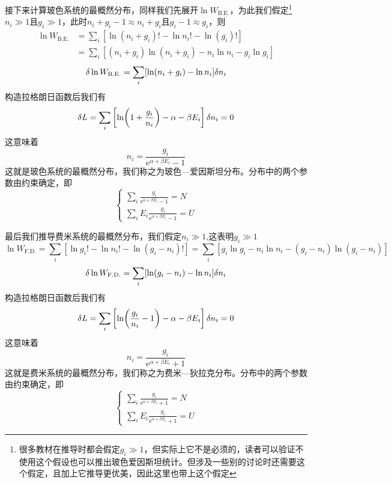 \documentclass[../../main.tex]{subfiles}
\begin{document}
接下来计算玻色系统的最概然分布，同样我们先展开\(\ln W_{\mathrm{B.E.}}\)，为此我们假定\footnote{很多教材在推导时都会假定\(g_i\gg 1\)，但实际上它不是必须的，读者可以验证不使用这个假设也可以推出玻色爱因斯坦统计。但涉及一些别的讨论时还需要这个假定，且加上它推导更优美，因此这里也带上这个假定}\(n_i\gg 1\)且\(g_i\gg 1\)，此时\(n_i+g_i-1\approx n_i+g_i\)且\(g_i-1\approx g_i\)，则
\begin{equation*}
    \begin{split}
        \ln W_{\mathrm{B.E.}}&=\sum_i [\ln(n_i+g_i)!-\ln n_i!-\ln(g_i)!] \\
        &=\sum_i [(n_i+g_i)\ln(n_i+g_i)-n_i\ln n_i-g_i\ln g_i]
    \end{split}
\end{equation*}
\begin{equation*}
    \var\ln W_{\mathrm{B.E.}}=\sum_i [\ln(n_i+g_i)-\ln n_i]\var n_i
\end{equation*}
构造拉格朗日函数后我们有
\begin{equation*}
    \var L=\sum_i \left[\ln(1+\frac{g_i}{n_i})-\alpha-\beta E_i\right]\var n_i=0
\end{equation*}
这意味着
\begin{equation}
    n_i=\frac{g_i}{\mathrm{e}^{\alpha+\beta E_i}-1}
\end{equation}
这就是玻色系统的最概然分布，我们称之为玻色—爱因斯坦分布。分布中的两个参数由约束确定，即
\begin{equation}
    \begin{cases}
        \displaystyle \sum_i \frac{g_i}{\mathrm{e}^{\alpha+\beta E_i}-1}=N \\
        \displaystyle \sum_i E_i\frac{g_i}{\mathrm{e}^{\alpha+\beta E_i}-1}=U
    \end{cases}
\end{equation}

最后我们推导费米系统的最概然分布，我们假定\(n_i\gg 1\),这表明\(g_i\gg 1\)
\begin{equation*}
    \ln W_{\mathrm{F.D.}}=\sum_i [\ln g_i!-\ln n_i!-\ln(g_i-n_i)!]=\sum_i[g_i\ln g_i-n_i\ln n_i-(g_i-n_i)\ln(g_i-n_i)]
\end{equation*}
\begin{equation*}
    \var\ln W_{\mathrm{F.D.}}=\sum_i [\ln(g_i-n_i)-\ln n_i]\var n_i
\end{equation*}
构造拉格朗日函数后我们有
\begin{equation*}
    \var L=\sum_i \left[\ln(\frac{g_i}{n_i}-1)-\alpha-\beta E_i\right]\var n_i=0
\end{equation*}
这意味着
\begin{equation}
    n_i=\frac{g_i}{\mathrm{e}^{\alpha+\beta E_i}+1}
\end{equation}
这就是费米系统的最概然分布，我们称之为费米—狄拉克分布。分布中的两个参数由约束确定，即
\begin{equation}
    \begin{cases}
        \displaystyle \sum_i \frac{g_i}{\mathrm{e}^{\alpha+\beta E_i}+1}=N \\
        \displaystyle \sum_i E_i\frac{g_i}{\mathrm{e}^{\alpha+\beta E_i}+1}=U
    \end{cases}
\end{equation}
\end{document}
